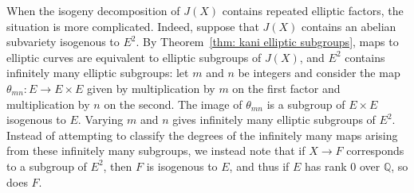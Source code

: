 \documentclass[12pt]{amsart}
\theoremstyle{definition}
\numberwithin{equation}{section}
\begin{document}
When the isogeny decomposition of $J(X)$ contains repeated elliptic factors, the situation is more complicated. Indeed, suppose that $J(X)$ contains an abelian subvariety isogenous to $E^2$. By Theorem~\ref{thm: kani elliptic subgroups}, maps to elliptic curves are equivalent to elliptic subgroups of $J(X)$, and $E^2$ contains infinitely many elliptic subgroups: let $m$ and $n$ be integers and consider the map $\theta_{mn}: E \to E \times E$ given by multiplication by $m$ on the first factor and multiplication by $n$ on the second. The image of $\theta_{mn}$ is a subgroup of $E \times E$ isogenous to $E$. Varying $m$ and $n$ gives infinitely many elliptic subgroups of $E^2$.
Instead of attempting to classify the degrees of the infinitely many maps arising from these infinitely many subgroups, we instead note that if $X \to F$ corresponds to a subgroup of $E^2$, then $F$ is isogenous to $E$, and thus if $E$ has rank 0 over $\mathbb{Q}$, so does $F$.
\end{document}

